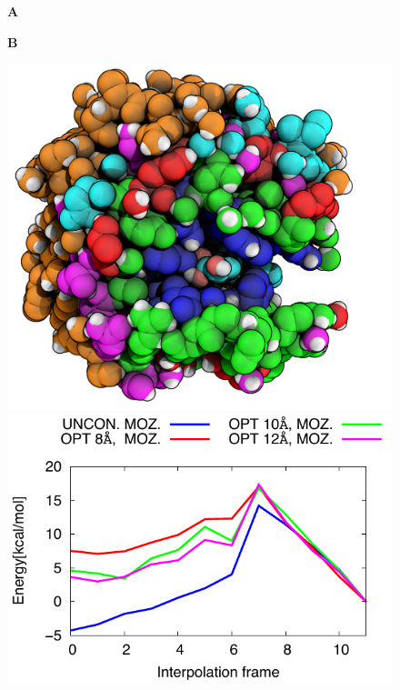 \begin{figure}[htbp] 
\centering
\begin{minipage}{0.42\linewidth}
\textbf{A}
\end{minipage}
\begin{minipage}{0.42\linewidth}
\textbf{B}
\end{minipage}
\begin{minipage}{0.47\linewidth}
\includegraphics[width=0.95\linewidth]{bcx-constraint-layers-ray-occlusion-2.png}
\end{minipage}
\begin{minipage}{0.51\linewidth}
\includegraphics[width=1.00\linewidth]{bcx-barriers-constraint-layers.pdf}

\end{minipage}
\end{figure}
